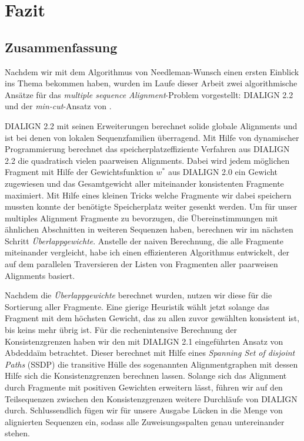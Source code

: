 \chapter{Fazit}
\label{ch:fazit}

\section{Zusammenfassung}

Nachdem wir mit dem Algorithmus von Needleman-Wunsch einen ersten Einblick ins Thema bekommen haben, wurden im Laufe dieser Arbeit zwei algorithmische Ansätze für das \emph{multiple sequence Alignment}-Problem vorgestellt: DIALIGN 2.2 und der \emph{min-cut}-Ansatz von \cite{cpm10}.

DIALIGN 2.2 mit seinen Erweiterungen berechnet solide globale Alignments und ist bei denen von lokalen Sequenzfamilien überragend. Mit Hilfe von dynamischer Programmierung berechnet das speicherplatzeffiziente Verfahren aus DIALIGN 2.2 die quadratisch vielen paarweisen Alignments. Dabei wird jedem möglichen Fragment mit Hilfe der Gewichtsfunktion $w^{*}$ aus DIALIGN 2.0 ein Gewicht zugewiesen und das Gesamtgewicht aller miteinander konsistenten Fragmente maximiert. Mit Hilfe eines kleinen Tricks welche Fragmente wir dabei speichern mussten konnte der benötigte Speicherplatz weiter gesenkt werden. Um für unser multiples Alignment Fragmente zu bevorzugen, die Übereinstimmungen mit ähnlichen Abschnitten in weiteren Sequenzen haben, berechnen wir im nächsten Schritt \emph{Überlappgewichte}. Anstelle der naiven Berechnung, die alle Fragmente miteinander vergleicht, habe ich einen effizienteren Algorithmus entwickelt, der auf dem parallelen Traversieren der Listen von Fragmenten aller paarweisen Alignments basiert.

Nachdem die \emph{Überlappgewichte} berechnet wurden, nutzen wir diese für die Sortierung aller Fragmente. Eine gierige Heuristik wählt jetzt solange das Fragment mit dem höchsten Gewicht, das zu allen zuvor gewählten konsistent ist, bis keins mehr übrig ist. Für die rechenintensive Berechnung der Konsistenzgrenzen haben wir den mit DIALIGN 2.1 eingeführten Ansatz von Abdedda\"im betrachtet. Dieser berechnet mit Hilfe eines \emph{Spanning Set of disjoint Paths} (SSDP) die transitive Hülle des sogenannten Alignmentgraphen mit dessen Hilfe sich die Konsistenzgrenzen berechnen lassen.
Solange sich das Alignment durch Fragmente mit positiven Gewichten erweitern lässt, führen wir auf den Teilsequenzen zwischen den Konsistenzgrenzen weitere Durchläufe von DIALIGN durch. Schlussendlich fügen wir für unsere Ausgabe Lücken in die Menge von alignierten Sequenzen ein, sodass alle Zuweisungsspalten genau untereinander stehen.
	
